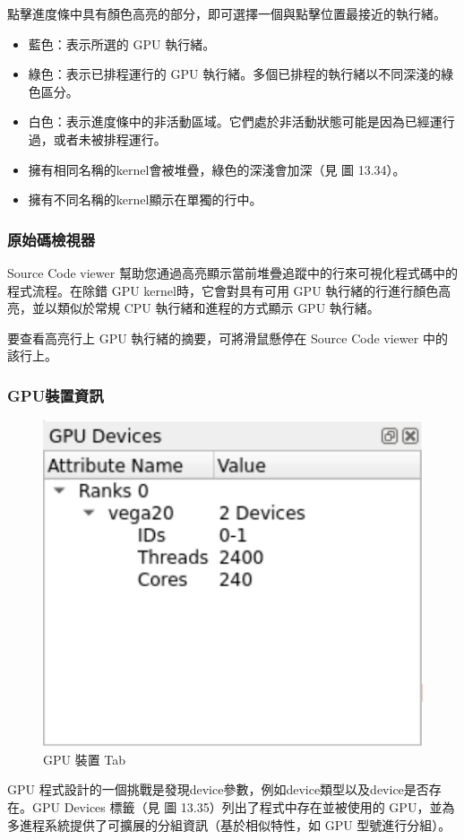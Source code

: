 點擊進度條中具有顏色高亮的部分，即可選擇一個與點擊位置最接近的執行緒。
\begin{itemize}
    \item 藍色：表示所選的 GPU 執行緒。
    \item 綠色：表示已排程運行的 GPU 執行緒。多個已排程的執行緒以不同深淺的綠色區分。
    \item 白色：表示進度條中的非活動區域。它們處於非活動狀態可能是因為已經運行過，或者未被排程運行。
    \item 擁有相同名稱的kernel會被堆疊，綠色的深淺會加深（見 圖 13.34）。
    \item 擁有不同名稱的kernel顯示在單獨的行中。
\end{itemize}


\subsubsection{原始碼檢視器}

Source Code viewer 幫助您通過高亮顯示當前堆疊追蹤中的行來可視化程式碼中的程式流程。在除錯 GPU kernel時，它會對具有可用 GPU 執行緒的行進行顏色高亮，並以類似於常規 CPU 執行緒和進程的方式顯示 GPU 執行緒。

要查看高亮行上 GPU 執行緒的摘要，可將滑鼠懸停在 Source Code viewer 中的該行上。


\subsubsection{GPU裝置資訊}

\begin{figure}
    \centering
    \includegraphics[width=0.4\linewidth]{FileAusiliari/Screenshots/Figure13-35.png}
    \caption{GPU 裝置 Tab}
    \label{fig:PAPI35}
\end{figure}

GPU 程式設計的一個挑戰是發現device參數，例如device類型以及device是否存在。GPU Devices 標籤（見 圖 13.35）列出了程式中存在並被使用的 GPU，並為多進程系統提供了可擴展的分組資訊（基於相似特性，如 GPU 型號進行分組）。


